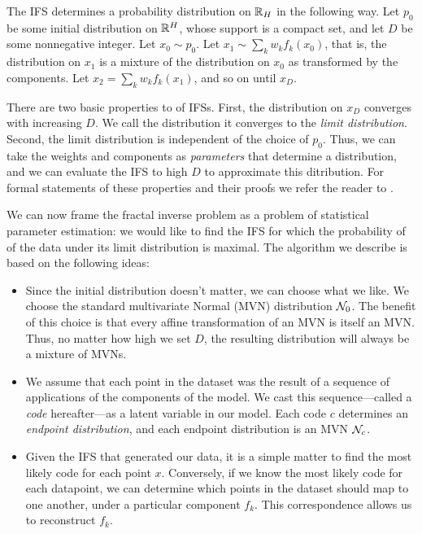 The IFS determines a probability distribution on ${\mathbb R}_H$ in the following way. Let $p_0$ be some initial distribution on ${\mathbb R}^H$, whose support is a compact set, and let $D$ be some nonnegative integer. Let  $x_0 \sim p_0$. Let $x_1 \sim \sum_k  w_k f_k(x_0)$, that is, the distribution on $x_1$ is a mixture of the distribution on $x_0$ as transformed by the components. Let  $x_2 = \sum_k w_k f_k(x_1)$, and so on until $x_D$.

There are two basic properties to of IFSs. First, the distribution on $x_D$ converges with increasing $D$. We call the distribution it converges to the \emph{limit distribution}. Second, the limit distribution is independent of the choice of $p_0$. Thus, we can take the weights and components as \emph{parameters} that determine a distribution, and we can evaluate the IFS to high $D$ to approximate this ditribution. For formal statements of these properties and their proofs we refer the reader to \cite{hutchinson2000deterministic}. 

We can now frame the fractal inverse problem as a problem of statistical parameter estimation: we would like to find the IFS for which the probability of of the data under its limit distribution is maximal. The algorithm we describe is based on the following ideas:
\begin{itemize}
  \item Since the initial distribution doesn't matter, we can choose what we like. We choose the standard multivariate Normal (MVN) distribution ${\cal N}_0$. The benefit of this choice is that every affine transformation of an MVN is itself an MVN. Thus, no matter how high we set $D$, the resulting distribution will always be a mixture of MVNs. 
  \item We assume that each point in the dataset was the result of a sequence of applications of the components of the model. We cast this sequence---called a \emph{code} hereafter---as a latent variable in our model. Each code $c$ determines an \emph{endpoint distribution}, and each endpoint distribution is an MVN ${\cal N}_c$.
  \item  Given the IFS that generated our data, it is a simple matter to find the most likely code for each point $x$. Conversely, if we know the most likely code for each datapoint, we can determine which points in the dataset should map to one another, under a particular component $f_k$. This correspondence allows us to reconstruct $f_k$.    
\end{itemize}

